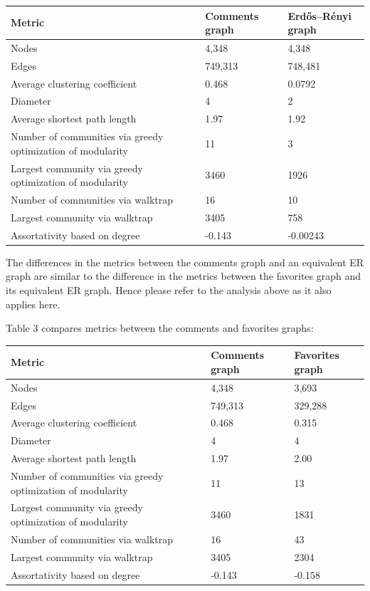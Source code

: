 \begin{tabular}{|l|l|l|}\hline
Metric & Comments graph & Erdős–Rényi graph \\ \hline
Nodes  & 4,348 & 4,348 \\
Edges  & 749,313 & 748,481 \\
Average clustering coefficient & 0.468 & 0.0792 \\
Diameter & 4 & 2 \\
Average shortest path length & 1.97 & 1.92 \\
Number of communities via greedy optimization of modularity & 11 & 3 \\
Largest community via greedy optimization of modularity & 3460 & 1926 \\
Number of communities via walktrap & 16 & 10 \\
Largest community via walktrap & 3405 & 758 \\
Assortativity based on degree & -0.143 & -0.00243 \\
\end{tabular}

The differences in the metrics between the comments graph and an
equivalent ER graph are similar to the difference in the metrics between
the favorites graph and its equivalent ER graph. Hence please refer to
the analysis above as it also applies here.

Table 3 compares metrics between the comments and favorites graphs:

\begin{tabular}{|l|l|l|}\hline
Metric & Comments graph & Favorites graph \\ \hline
Nodes  & 4,348 & 3,693 \\
Edges  & 749,313 & 329,288 \\
Average clustering coefficient & 0.468 & 0.315 \\
Diameter & 4 & 4 \\
Average shortest path length & 1.97 & 2.00 \\
Number of communities via greedy optimization of modularity & 11 & 13 \\
Largest community via greedy optimization of modularity & 3460 & 1831 \\
Number of communities via walktrap & 16 & 43 \\
Largest community via walktrap & 3405 & 2304 \\
Assortativity based on degree & -0.143 & -0.158 \\
\end{tabular}

